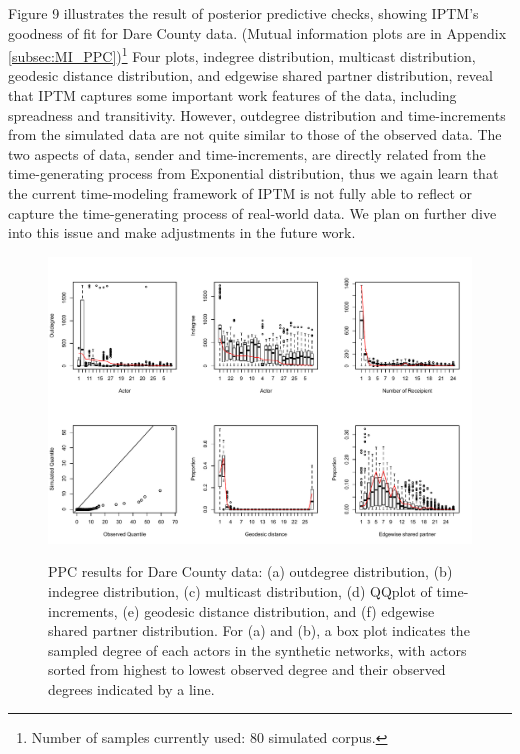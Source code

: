  Figure 9 illustrates the result of posterior predictive checks, showing IPTM's goodness of fit for Dare County data. (Mutual information plots are in Appendix \ref{subsec:MI_PPC})\footnote{\noindent Number of samples currently used: 80 simulated corpus.} Four plots, indegree distribution, multicast distribution, geodesic distance distribution, and edgewise shared partner distribution, reveal that IPTM captures some important work features of the data, including spreadness and transitivity. However, outdegree distribution and time-increments from the simulated data are not quite similar to those of the observed data. The two aspects of data, sender and time-increments, are directly related from the time-generating process from Exponential distribution, thus we again learn that the current time-modeling framework of IPTM is not fully able to reflect or capture the time-generating process of real-world data. We plan on further dive into this issue and make adjustments in the future work.
\begin{figure}[H]
	\centering
	\includegraphics[width=1\textwidth]{plots/PPC_plot.pdf}  
	\label{fig:DarePPC}
	\caption{PPC results for Dare County data: (a) outdegree distribution, (b) indegree distribution, (c) multicast distribution, (d) QQplot of time-increments, (e) geodesic distance distribution, and (f) edgewise shared partner distribution. For (a) and (b), a box plot indicates the sampled degree of each actors in the synthetic networks, with actors sorted from highest to lowest observed degree and their observed degrees indicated by a line.}
\end{figure}
